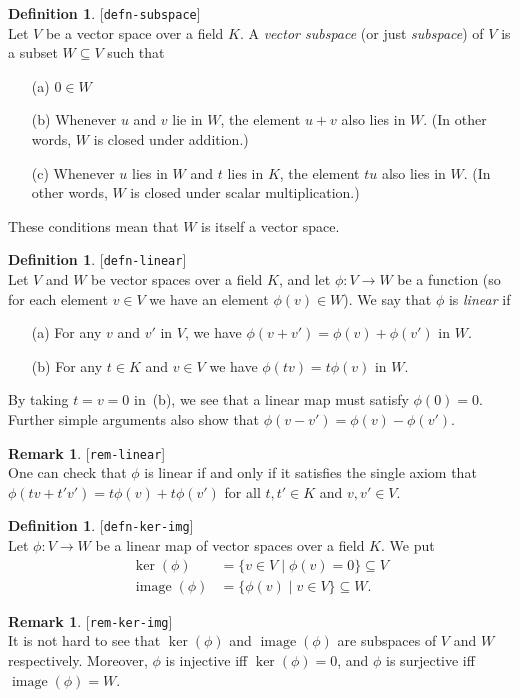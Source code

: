 \documentclass{amsart}
\newcommand{\lbl}[1]{\label{#1}\textup{[\texttt{#1}]}\ \\}
\newcommand{\lbl}{\label}
\newcommand{\img}       {\operatorname{image}}
\newcommand{\st}        {\;|\;}
\newcommand{\sse}       {\subseteq}
\newcommand{\xra}       {\xrightarrow}
\renewcommand{\:}{\colon}
\theoremstyle{definition}
\newtheorem{remark}[theorem]{Remark}
\newtheorem{definition}[theorem]{Definition}
\begin{document}
\begin{definition}\lbl{defn-subspace}
 Let $V$ be a vector space over a field $K$.  A \emph{vector subspace}
 (or just \emph{subspace}) of $V$ is a subset $W\sse V$ such that
 \begin{itemize}
  \item[(a)] $0\in W$
  \item[(b)] Whenever $u$ and $v$ lie in $W$, the element $u+v$ also
   lies in $W$.  (In other words, $W$ is closed under addition.)
  \item[(c)] Whenever $u$ lies in $W$ and $t$ lies in $K$, the
   element $tu$ also lies in $W$.  (In other words, $W$ is
   closed under scalar multiplication.)
 \end{itemize}
 These conditions mean that $W$ is itself a vector space.
\end{definition}

\begin{definition}\lbl{defn-linear}
 Let $V$ and $W$ be vector spaces over a field $K$, and let
 $\phi\:V\xra{}W$ be a function (so for each element $v\in V$ we have
 an element $\phi(v)\in W$).  We say that $\phi$ is \emph{linear} if
 \begin{itemize}
  \item[(a)] For any $v$ and $v'$ in $V$, we have
   $\phi(v+v')=\phi(v)+\phi(v')$ in $W$.
  \item[(b)] For any $t\in K$ and $v\in V$ we have
   $\phi(tv)=t\phi(v)$ in $W$. 
 \end{itemize}
 By taking $t=v=0$ in~(b), we see that a linear map must satisfy
 $\phi(0)=0$.  Further simple arguments also show that
 $\phi(v-v')=\phi(v)-\phi(v')$.
\end{definition}
\begin{remark}\lbl{rem-linear}
 One can check that $\phi$ is linear if and only if it satisfies the
 single axiom that $\phi(tv+t'v')=t\phi(v)+t\phi(v')$ for all
 $t,t'\in K$ and $v,v'\in V$.
\end{remark}

\begin{definition}\lbl{defn-ker-img}
 Let $\phi\:V\to W$ be a linear map of vector spaces over a field
 $K$.  We put 
 \begin{align*}
  \ker(\phi) &= \{v\in V\st \phi(v)=0\} \sse V \\
  \img(\phi) &= \{\phi(v) \st v\in V\} \sse W.
 \end{align*}
\end{definition}
\begin{remark}\lbl{rem-ker-img}
 It is not hard to see that $\ker(\phi)$ and $\img(\phi)$ are
 subspaces of $V$ and $W$ respectively.  Moreover, $\phi$ is injective
 iff $\ker(\phi)=0$, and $\phi$ is surjective iff $\img(\phi)=W$. 
\end{remark}
\end{document}
